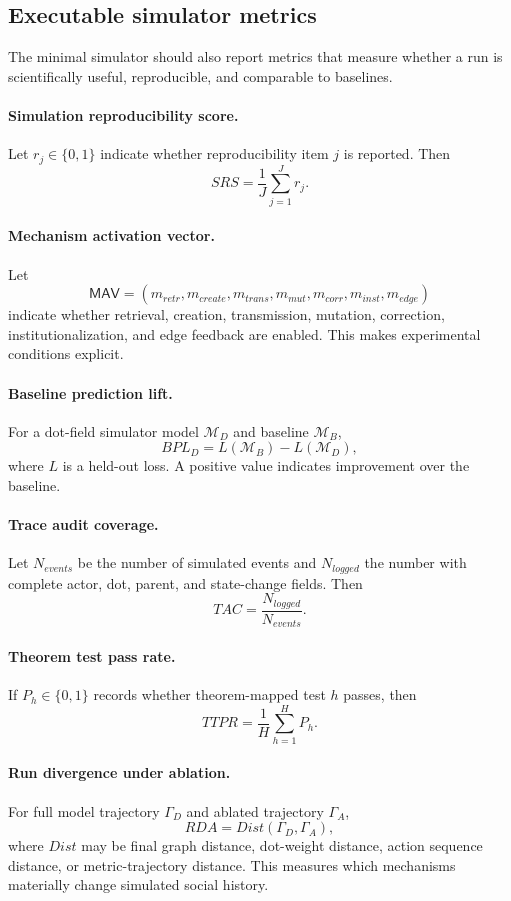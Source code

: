 \documentclass[11pt]{article}
\theoremstyle{remark}
\begin{document}
\subsection{Executable simulator metrics}\label{executable-simulator-metrics}

The minimal simulator should also report metrics that measure whether a
run is scientifically useful, reproducible, and comparable to baselines.

\paragraph{Simulation reproducibility score.}
Let $r_j\in\{0,1\}$ indicate whether reproducibility item $j$ is
reported. Then
$$
SRS=\frac{1}{J}\sum_{j=1}^J r_j.
$$

\paragraph{Mechanism activation vector.}
Let
$$
\mathsf{MAV}=(m_{retr},m_{create},m_{trans},m_{mut},m_{corr},m_{inst},m_{edge})
$$
indicate whether retrieval, creation, transmission, mutation,
correction, institutionalization, and edge feedback are enabled. This
makes experimental conditions explicit.

\paragraph{Baseline prediction lift.}
For a dot-field simulator model $\mathcal M_D$ and baseline
$\mathcal M_B$,
$$
BPL_D=L(\mathcal M_B)-L(\mathcal M_D),
$$
where $L$ is a held-out loss. A positive value indicates improvement
over the baseline.

\paragraph{Trace audit coverage.}
Let $N_{events}$ be the number of simulated events and $N_{logged}$ the
number with complete actor, dot, parent, and state-change fields. Then
$$
TAC=\frac{N_{logged}}{N_{events}}.
$$

\paragraph{Theorem test pass rate.}
If $P_h\in\{0,1\}$ records whether theorem-mapped test $h$ passes, then
$$
TTPR=\frac{1}{H}\sum_{h=1}^H P_h.
$$

\paragraph{Run divergence under ablation.}
For full model trajectory $\Gamma_D$ and ablated trajectory $\Gamma_A$,
$$
RDA=Dist(\Gamma_D,\Gamma_A),
$$
where $Dist$ may be final graph distance, dot-weight distance, action
sequence distance, or metric-trajectory distance. This measures which
mechanisms materially change simulated social history.
\end{document}
